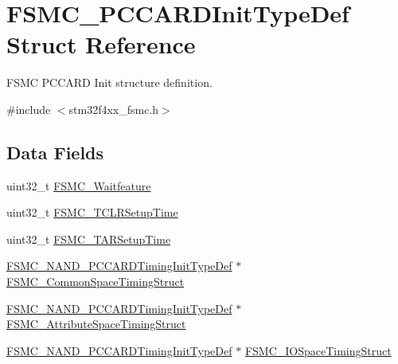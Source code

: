 \hypertarget{struct_f_s_m_c___p_c_c_a_r_d_init_type_def}{\section{F\-S\-M\-C\-\_\-\-P\-C\-C\-A\-R\-D\-Init\-Type\-Def Struct Reference}
\label{struct_f_s_m_c___p_c_c_a_r_d_init_type_def}
}


F\-S\-M\-C P\-C\-C\-A\-R\-D Init structure definition.  




{\ttfamily \#include $<$stm32f4xx\-\_\-fsmc.\-h$>$}

\subsection*{Data Fields}
\begin{DoxyCompactItemize}
\item 
uint32\-\_\-t \hyperlink{struct_f_s_m_c___p_c_c_a_r_d_init_type_def_a9ecc2cc3ec6462a8a86e545c9b8ff3cf}{F\-S\-M\-C\-\_\-\-Waitfeature}
\item 
uint32\-\_\-t \hyperlink{struct_f_s_m_c___p_c_c_a_r_d_init_type_def_ab9fd4e9d4db1fc098d5f4ccffb80bf61}{F\-S\-M\-C\-\_\-\-T\-C\-L\-R\-Setup\-Time}
\item 
uint32\-\_\-t \hyperlink{struct_f_s_m_c___p_c_c_a_r_d_init_type_def_ab1fc3b07b6286b4974690191231f2773}{F\-S\-M\-C\-\_\-\-T\-A\-R\-Setup\-Time}
\item 
\hyperlink{struct_f_s_m_c___n_a_n_d___p_c_c_a_r_d_timing_init_type_def}{F\-S\-M\-C\-\_\-\-N\-A\-N\-D\-\_\-\-P\-C\-C\-A\-R\-D\-Timing\-Init\-Type\-Def} $\ast$ \hyperlink{struct_f_s_m_c___p_c_c_a_r_d_init_type_def_aec43dfa3b0c0ef09b02ac1b27cac92c7}{F\-S\-M\-C\-\_\-\-Common\-Space\-Timing\-Struct}
\item 
\hyperlink{struct_f_s_m_c___n_a_n_d___p_c_c_a_r_d_timing_init_type_def}{F\-S\-M\-C\-\_\-\-N\-A\-N\-D\-\_\-\-P\-C\-C\-A\-R\-D\-Timing\-Init\-Type\-Def} $\ast$ \hyperlink{struct_f_s_m_c___p_c_c_a_r_d_init_type_def_a96d5a1d02a42f194b9d5ebaae46dd3d7}{F\-S\-M\-C\-\_\-\-Attribute\-Space\-Timing\-Struct}
\item 
\hyperlink{struct_f_s_m_c___n_a_n_d___p_c_c_a_r_d_timing_init_type_def}{F\-S\-M\-C\-\_\-\-N\-A\-N\-D\-\_\-\-P\-C\-C\-A\-R\-D\-Timing\-Init\-Type\-Def} $\ast$ \hyperlink{struct_f_s_m_c___p_c_c_a_r_d_init_type_def_ad3bf6a882f03e3406149d94585dce78e}{F\-S\-M\-C\-\_\-\-I\-O\-Space\-Timing\-Struct}
\end{DoxyCompactItemize}


